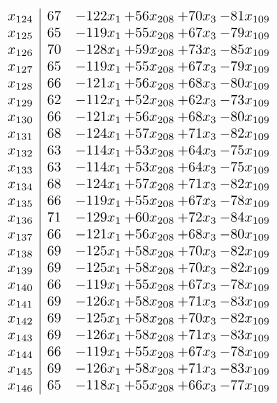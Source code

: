 \documentclass[11pt]{article}
\begin{document}
\[\begin{array}{c| c c@{\hskip 2pt} c@{\hskip 2pt} c@{\hskip 2pt} c@{\hskip 2pt} }
 x_{124}   &  67 & -122 x_{1} & + 56 x_{208} & + 70 x_{3} & -81 x_{109}\\
 x_{125}   &  65 & -119 x_{1} & + 55 x_{208} & + 67 x_{3} & -79 x_{109}\\
 x_{126}   &  70 & -128 x_{1} & + 59 x_{208} & + 73 x_{3} & -85 x_{109}\\
 x_{127}   &  65 & -119 x_{1} & + 55 x_{208} & + 67 x_{3} & -79 x_{109}\\
 x_{128}   &  66 & -121 x_{1} & + 56 x_{208} & + 68 x_{3} & -80 x_{109}\\
 x_{129}   &  62 & -112 x_{1} & + 52 x_{208} & + 62 x_{3} & -73 x_{109}\\
 x_{130}   &  66 & -121 x_{1} & + 56 x_{208} & + 68 x_{3} & -80 x_{109}\\
 x_{131}   &  68 & -124 x_{1} & + 57 x_{208} & + 71 x_{3} & -82 x_{109}\\
 x_{132}   &  63 & -114 x_{1} & + 53 x_{208} & + 64 x_{3} & -75 x_{109}\\
 x_{133}   &  63 & -114 x_{1} & + 53 x_{208} & + 64 x_{3} & -75 x_{109}\\
 x_{134}   &  68 & -124 x_{1} & + 57 x_{208} & + 71 x_{3} & -82 x_{109}\\
 x_{135}   &  66 & -119 x_{1} & + 55 x_{208} & + 67 x_{3} & -78 x_{109}\\
 x_{136}   &  71 & -129 x_{1} & + 60 x_{208} & + 72 x_{3} & -84 x_{109}\\
 x_{137}   &  66 & -121 x_{1} & + 56 x_{208} & + 68 x_{3} & -80 x_{109}\\
 x_{138}   &  69 & -125 x_{1} & + 58 x_{208} & + 70 x_{3} & -82 x_{109}\\
 x_{139}   &  69 & -125 x_{1} & + 58 x_{208} & + 70 x_{3} & -82 x_{109}\\
 x_{140}   &  66 & -119 x_{1} & + 55 x_{208} & + 67 x_{3} & -78 x_{109}\\
 x_{141}   &  69 & -126 x_{1} & + 58 x_{208} & + 71 x_{3} & -83 x_{109}\\
 x_{142}   &  69 & -125 x_{1} & + 58 x_{208} & + 70 x_{3} & -82 x_{109}\\
 x_{143}   &  69 & -126 x_{1} & + 58 x_{208} & + 71 x_{3} & -83 x_{109}\\
 x_{144}   &  66 & -119 x_{1} & + 55 x_{208} & + 67 x_{3} & -78 x_{109}\\
 x_{145}   &  69 & -126 x_{1} & + 58 x_{208} & + 71 x_{3} & -83 x_{109}\\
 x_{146}   &  65 & -118 x_{1} & + 55 x_{208} & + 66 x_{3} & -77 x_{109}\\

\end{array}\]
\end{document}
